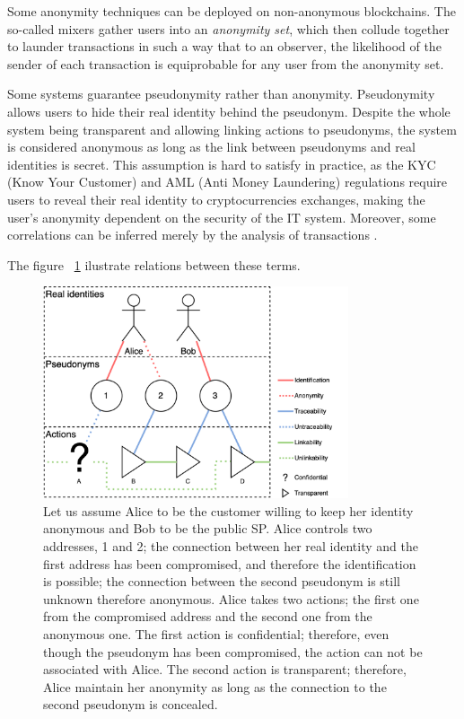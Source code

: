 \documentclass{ieeeaccess}
\begin{document}
Some anonymity techniques can be deployed on non-anonymous blockchains. The so-called mixers gather users into an \textit{anonymity set}, which then collude together to launder transactions in such a way that to an observer, the likelihood of the sender of each transaction is equiprobable for any user from the anonymity set.

Some systems guarantee pseudonymity rather than anonymity. Pseudonymity allows users to hide their real identity behind the pseudonym. Despite the whole system being transparent and allowing linking actions to pseudonyms, the system is considered anonymous as long as the link between pseudonyms and real identities is secret. This assumption is hard to satisfy in practice, as the KYC (Know Your Customer) and AML (Anti Money Laundering) regulations require users to reveal their real identity to cryptocurrencies exchanges, making the user's anonymity dependent on the security of the IT system. Moreover, some correlations can be inferred merely by the analysis of transactions \cite{androulaki2013evaluating, ober2013structure}.

The figure ~\ref{fig:anonymity-diagram1} ilustrate relations between these terms.

\begin{figure}[h!]
\includegraphics[width=9cm]{anonymity-diagram.png}
\centering
\caption{Let us assume Alice to be the customer willing to keep her identity anonymous and Bob to be the public SP. Alice controls two addresses, 1 and 2; the connection between her real identity and the first address has been compromised, and therefore the identification is possible; the connection between the second pseudonym is still unknown therefore anonymous. Alice takes two actions; the first one from the compromised address and the second one from the anonymous one. The first action is confidential; therefore, even though the pseudonym has been compromised, the action can not be associated with Alice. The second action is transparent; therefore, Alice maintain her anonymity as long as the connection to the second pseudonym is concealed.}

\label{fig:anonymity-diagram1}
\end{figure}
\end{document}
